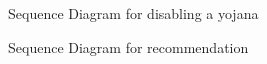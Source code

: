 \documentclass[conference]{IEEEtran}
\begin{document}
\begin{figure}[h!]
\centering
{}
\caption{Sequence Diagram for disabling a yojana}
\end{figure}
\begin{figure}[h!]
\centering
{}
\caption{Sequence Diagram for recommendation}
\end{figure}
\end{document}
